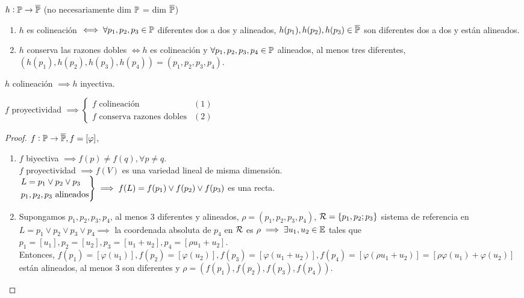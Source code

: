 \begin{defi}
    $h : \mathbb{P} \to \overline{\mathbb{P}}$ (no necesariamente dim $\mathbb{P}$ = dim $\overline{\mathbb{P}}$)
    \begin{enumerate}
        \item $h$ es colineación $\iff \forall p_1, p_2, p_3 \in \mathbb{P}$ diferentes dos a dos y alineados, $h(p_1), h(p_2), h(p_3) \in \overline{\mathbb{P}}$ son diferentes dos a dos y están alineados.
        \item $h$ conserva las razones dobles $\iff h$ es colineación y $\forall p_1, p_2, p_3, p_4 \in \mathbb{P}$ alineados, al menos tres diferentes, $(h(p_1), h(p_2), h(p_3), h(p_4)) = (p_1, p_2, p_3, p_4)$.
    \end{enumerate}
\end{defi}
\begin{obs}
    $h$ colineación $\implies h$ inyectiva.
\end{obs}
\begin{prop}
    $f$ proyectividad $\implies \begin{cases} f \text{ colineación} & (1) \label{coli} \\ f \text{ conserva razones dobles} & (2) \label{cons_raz_dob} \end{cases}$
\end{prop}
\begin{proof}
    $f : \mathbb{P} \to \overline{\mathbb{P}}, f = [\varphi]$,
    \begin{enumerate}[(1)]
        \item $f$ biyectiva $\implies f(p) \neq f(q), \forall p \neq q$. \\
        $f$ proyectividad $\implies f(V)$ es una variedad lineal de misma dimensión. \\
        $\begin{rcases}
        L = p_1 \vee p_2 \vee p_3 \\
        p_1, p_2, p_3 \text{ alineados}
        \end{rcases}
        \implies f(L) = f(p_1) \vee f(p_2) \vee f(p_3)$ es una recta.
        \item Supongamos $p_1, p_2, p_3, p_4$, al menos 3 diferentes y alineados, $\rho = (p_1, p_2, p_3, p_4)$, $\mathcal{R} = \{p_1, p_2; p_3\}$ sistema de referencia en $L = p_1 \vee p_2 \vee p_3 \vee p_4 \implies$ la coordenada absoluta de $p_4$ en $\mathcal{R}$ es $\rho \implies \exists u_1, u_2 \in \mathbb{E}$ tales que $p_1 = [u_1], p_2 = [u_2], p_3 = [u_1 + u_2], p_4 = [\rho u_1 + u_2]$. \\
        Entonces, $f(p_1) = [\varphi(u_1)], f(p_2) = [\varphi(u_2)], f(p_3) = [\varphi(u_1 + u_2)], f(p_4) = [\varphi(\rho u_1 + u_2)] = [\rho \varphi(u_1) + \varphi(u_2)]$ están alineados, al menos 3 son diferentes y $\rho = (f(p_1), f(p_2), f(p_3), f(p_4))$.
    \end{enumerate}
\end{proof}

